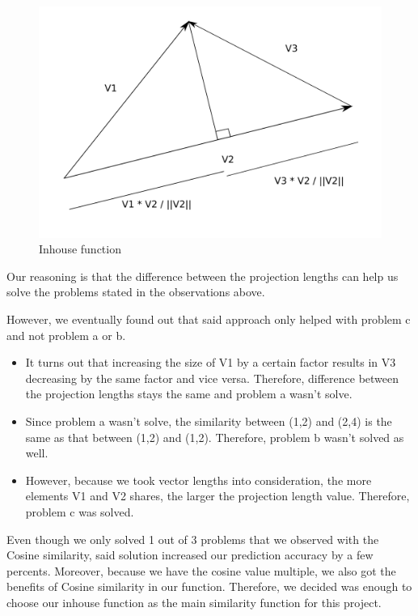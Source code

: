 \documentclass{article}
\begin{document}
\begin{figure}[ht]
\centering
\includegraphics[scale=0.2]{inhouse.png}
\caption{Inhouse function}
\label{fig:universe}
\end{figure}

Our reasoning is that the difference between the projection lengths can help us solve the problems stated in the observations above. 

However, we eventually found out that said approach only helped with problem c and not problem a or b. 

\begin{itemize}
    \item It turns out that increasing the size of V1 by a certain factor results in V3 decreasing by the same factor and vice versa. Therefore, difference between the projection lengths stays the same and problem a wasn't solve.
    
    \item Since problem a wasn't solve, the similarity between (1,2) and (2,4) is the same as that between (1,2) and (1,2). Therefore, problem b wasn't solved as well.
    
    \item However, because we took vector lengths into consideration, the more elements V1 and V2 shares, the larger the projection length value. Therefore, problem c was solved.
\end{itemize}

Even though we only solved 1 out of 3 problems that we observed with the Cosine similarity, said solution increased our prediction accuracy by a few percents. Moreover, because we have the cosine value multiple, we also got the benefits of Cosine similarity in our function. Therefore, we decided was enough to choose our inhouse function as the main similarity function for this project.
\end{document}
